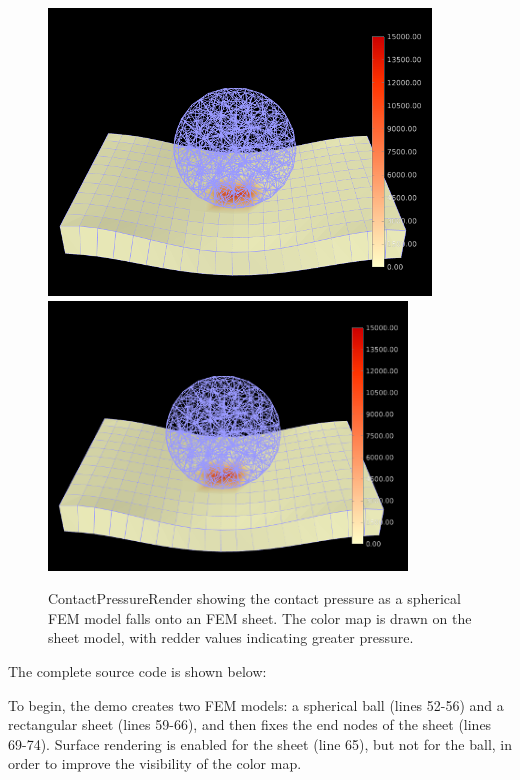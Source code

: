 \begin{figure}[ht]
\begin{center}
\iflatexml
 \includegraphics[]{images/ContactPressureRender}
\else
 \includegraphics[width=3.75in]{images/ContactPressureRender}
\fi
\end{center}
\caption{ContactPressureRender showing the contact pressure as a
spherical FEM model falls onto an FEM sheet.  The color map is drawn
on the sheet model, with redder values indicating greater pressure.}
\label{ContactPressureRender:fig}
\end{figure}

The complete source code is shown below:
%
\lstset{numbers=left}

\lstset{numbers=none} 

To begin, the demo creates two FEM models: a spherical ball (lines
52-56) and a rectangular sheet (lines 59-66), and then fixes the end
nodes of the sheet (lines 69-74). Surface rendering is enabled for
the sheet (line 65), but not for the ball, in order to improve the
visibility of the color map.


